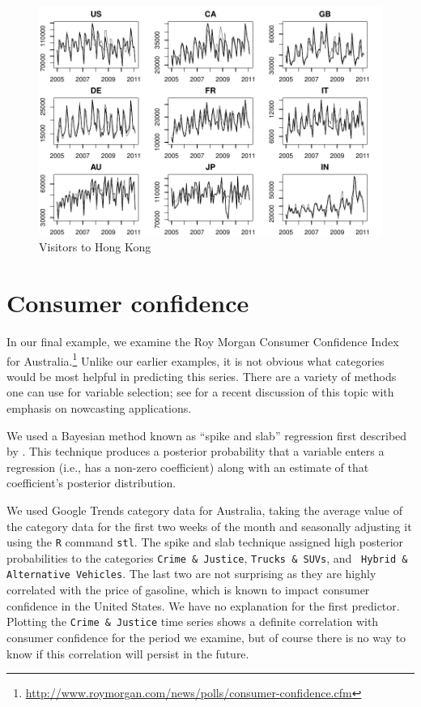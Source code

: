 \documentclass[12pt, oneside]{article}
\begin{document}
\begin{figure}[ht]
\begin{center}
\includegraphics[width= 5.5in]{hk}
\caption{\label{Fig:hk} Visitors to Hong Kong} 
\end{center}
\end{figure}

\section{Consumer confidence \label{Sec:Confidence}}  

In our final example, we examine the Roy Morgan Consumer Confidence
Index for
Australia.\footnote{\url{http://www.roymorgan.com/news/polls/consumer-confidence.cfm}}
Unlike our earlier examples, it is not obvious what categories would
be most helpful in predicting this series.  There are a variety of
methods one can use for variable selection; see \cite{Castle10} for a
recent discussion of this topic with emphasis on nowcasting
applications.

We used a Bayesian method known as ``spike and slab'' regression first
described by \cite{George97}. This technique produces a posterior
probability that a variable enters a regression (i.e., has a non-zero
coefficient) along with an estimate of that coefficient's posterior
distribution.

We used Google Trends category data for Australia, taking the average
value of the category data for the first two weeks of the month and
seasonally adjusting it using the {\tt R} command {\tt stl}.  The
spike and slab technique assigned high posterior probabilities to the
categories {\tt Crime \& Justice}, {\tt Trucks \& SUVs}, and {\tt
  Hybrid \& Alternative Vehicles}.  The last two are not surprising as
they are highly correlated with the price of gasoline, which is known
to impact consumer confidence in the United States.  We have no
explanation for the first predictor. Plotting the {\tt Crime \&
  Justice} time series shows a definite correlation with consumer
confidence for the period we examine, but of course there is no way to
know if this correlation will persist in the future.
\end{document}
